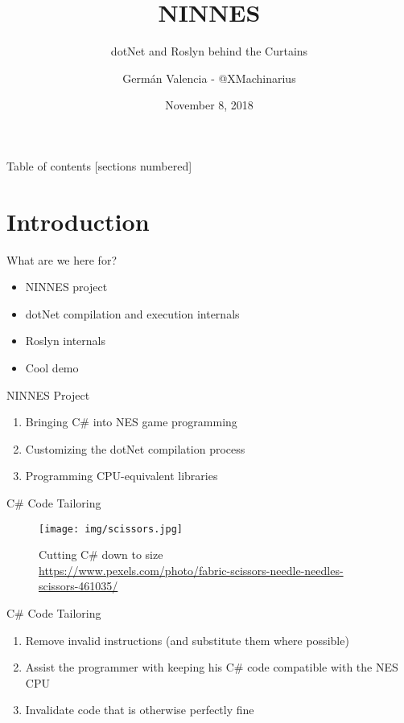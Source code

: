 \documentclass[10pt]{beamer}
\title{NINNES}
\subtitle{dotNet and Roslyn behind the Curtains}
\date{November 8, 2018}
\author{Germán Valencia - @XMachinarius}
\institute{Growth Acceleration Partners}
\begin{document}
\maketitle

\begin{frame}{Table of contents}
  [sections numbered]
  \tableofcontents[hideallsubsections]
\end{frame}

\section{Introduction}
\begin{frame}{What are we here for?}
    \begin{itemize}
        \item NINNES project
        \item dotNet compilation and execution internals
        \item Roslyn internals
        \item Cool demo
    \end{itemize}
\end{frame}

\begin{frame}{NINNES Project}
    \begin{enumerate}
        \item Bringing C\# into NES game programming
        \item Customizing the dotNet compilation process
        \item Programming CPU-equivalent libraries
    \end{enumerate}
\end{frame}

\begin{frame}{C\# Code Tailoring}
    \begin{figure}
        \centering
        \texttt{[image: img/scissors.jpg]}
        \caption{Cutting C\# down to size \\ \tiny{\href{Photo by Pixabay, taken from Pexels}{https://www.pexels.com/photo/fabric-scissors-needle-needles-scissors-461035/}}}
    \end{figure}
\end{frame}

\begin{frame}{C\# Code Tailoring}
    \begin{enumerate}
        \item Remove invalid instructions (and substitute them where possible)
        \item Assist the programmer with keeping his C\# code compatible with the NES CPU
        \item Invalidate code that is otherwise perfectly fine
    \end{enumerate}
\end{frame}
\end{document}
